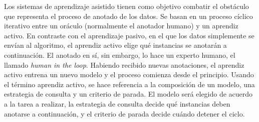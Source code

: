 Los sistemas de aprendizaje asistido tienen como objetivo combatir el obstáculo que representa el proceso de anotado de los datos. Se basan en un proceso cíclico iterativo entre un oráculo (normalmente el anotador humano) y un aprendiz activo. En contraste con el aprendizaje pasivo, en el que los datos simplemente se envían al algoritmo, el aprendiz activo elige qué instancias se anotarán a continuación. El anotado en sí, sin embargo, lo hace un experto humano, el llamado \textit{human in the loop}. Habiendo recibido nuevas anotaciones, el aprendiz activo entrena un nuevo modelo y el proceso comienza desde el principio. Usando el término aprendiz activo, se hace referencia a la composición de un modelo, una estrategia de consulta y un criterio de parada. El modelo será elegido de acuerdo a la tarea a realizar, la estrategia de consulta decide qué instancias deben anotarse a continuación, y el criterio de parada decide cuándo detener el ciclo. 




